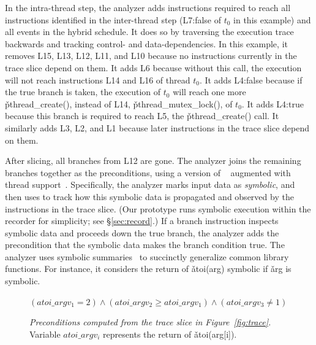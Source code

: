 In the intra-thread step, the analyzer adds instructions required 
to reach all instructions identified in the
inter-thread step (L7:false of $t_0$ in this example) and all events in
the hybrid schedule.  It does so by traversing the execution trace
backwards and tracking control- and data-dependencies.  In this example, it
removes L15, L13, L12, L11, and L10 because no instructions currently in
the trace slice depend on them.  It adds L6 because without this call, the
execution will not reach instructions L14 and L16 of thread $t_0$.  It adds
L4:false because if the true branch is taken, the execution of $t_0$ will
reach one more \v{pthread\_create()}, instead of L14,
\v{pthread\_mutex\_lock()}, of $t_0$.  It adds L4:true because this branch
is required to reach L5, the \v{pthread\_create()} call.  It similarly
adds L3, L2, and L1 because later instructions in the trace slice
depend on them.




After slicing, all branches from L12 are gone.  The
analyzer joins the remaining branches together as the
preconditions, using a version of \klee~\cite{klee:osdi08} augmented with
thread support~\cite{cui:tern:osdi10}.  Specifically, the analyzer marks
input data as \emph{symbolic}, and then uses \klee to track how this symbolic
data is propagated and observed by the instructions in the trace slice.
(Our \peregrine prototype runs symbolic execution within the recorder for
simplicity; see \S\ref{sec:record}.)
If a branch instruction inspects symbolic data and proceeds down the true
branch, the analyzer adds the precondition that the symbolic data makes
the branch condition true.  The analyzer uses symbolic
summaries~\cite{castro:bouncer} to succinctly generalize common library
functions.  For instance, it considers the return of \v{atoi(arg)}
symbolic if \v{arg} is symbolic.

\begin{figure}[t]
\centering
\begin{minipage}[t]{3.1in}
\begin{scriptsize}
$(atoi\_argv_1 = 2) \wedge (atoi\_argv_2 \geq atoi\_argv_1) \wedge
  (atoi\_argv_3 \neq 1) $
\end{scriptsize}
\end{minipage}
\caption{{\em Preconditions computed from the trace slice in
    Figure~\ref{fig:trace}.}  Variable $atoi\_argv_i$ represents the
  return of \v{atoi(arg[i])}.} \label{fig:precond}
\end{figure}

